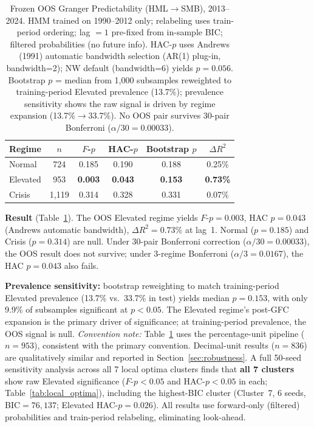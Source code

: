 \documentclass[sigconf,anonymous]{acmart}
\begin{document}
\begin{table}[t]
\centering
\setlength{\tabcolsep}{5pt}
\caption{Frozen OOS Granger Predictability (HML$\to$SMB), 2013--2024.
HMM trained on 1990--2012 only; relabeling uses train-period ordering;
lag $= 1$ pre-fixed from in-sample BIC; filtered probabilities (no future info).
HAC-$p$ uses Andrews (1991) automatic bandwidth selection (AR(1) plug-in, bandwidth=2);
NW default (bandwidth=6) yields $p = 0.056$.
Bootstrap $p$ = median from 1,000 subsamples reweighted to training-period
Elevated prevalence (13.7\%); prevalence sensitivity shows the raw signal
is driven by regime expansion (13.7\%$\to$33.7\%).
No OOS pair survives 30-pair Bonferroni ($\alpha/30 = 0.00033$).}
\label{tab:frozen_granger}
\small
\begin{tabular}{@{}lccccc@{}}
\toprule
Regime & $n$ & $F$-$p$ & HAC-$p$ & Bootstrap $p$ & $\Delta R^2$ \\
\midrule
Normal    & 724 & 0.185 & 0.190 & 0.188 & 0.25\% \\
Elevated  & 953 & \textbf{0.003} & \textbf{0.043} & \textbf{0.153} & \textbf{0.73\%} \\
Crisis    & 1,119 & 0.314 & 0.328 & 0.331 & 0.07\% \\
\bottomrule
\end{tabular}
\end{table}

\textbf{Result} (Table~\ref{tab:frozen_granger}). The OOS Elevated regime yields
$F$-$p = 0.003$, HAC $p = 0.043$ (Andrews automatic bandwidth),
$\Delta R^2 = 0.73\%$ at lag~1. Normal ($p = 0.185$) and Crisis ($p = 0.314$) are null.
Under 30-pair Bonferroni correction ($\alpha/30 = 0.00033$), the OOS result does not
survive; under 3-regime Bonferroni ($\alpha/3 = 0.0167$), the HAC $p = 0.043$ also fails.

\textbf{Prevalence sensitivity:} bootstrap reweighting to match training-period
Elevated prevalence (13.7\% vs.\ 33.7\% in test) yields median $p = 0.153$,
with only 9.9\% of subsamples significant at $p < 0.05$.
The Elevated regime's post-GFC expansion is the primary driver of significance;
at training-period prevalence, the OOS signal is null.
\emph{Convention note:} Table~\ref{tab:frozen_granger} uses the percentage-unit
pipeline ($n = 953$), consistent with the primary convention.
Decimal-unit results ($n = 836$) are qualitatively similar and reported in
Section~\ref{sec:robustness}.
A full 50-seed sensitivity analysis across all 7 local optima clusters finds that
\textbf{all 7 clusters} show raw Elevated significance ($F$-$p < 0.05$ and HAC-$p < 0.05$
in each; Table~\ref{tab:local_optima}), including the highest-BIC cluster
(Cluster~7, 6 seeds, BIC$= 76{,}137$; Elevated HAC-$p = 0.026$).
All results use forward-only (filtered) probabilities and train-period relabeling,
eliminating look-ahead.
\end{document}
